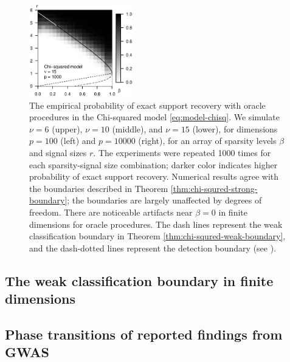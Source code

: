 \begin{figure}
      \includegraphics[width=0.4\textwidth]{./simulated_phase_diagram_chi-squared_nu15_p10000.eps}
      \caption{The empirical probability of exact support recovery with oracle procedures in the Chi-squared model \eqref{eq:model-chisq}. 
      We simulate $\nu=6$ (upper), $\nu=10$ (middle), and $\nu=15$ (lower), for dimensions $p=100$ (left) and $p=10000$ (right), for an array of sparsity levels $\beta$ and signal sizes $r$.
      The experiments were repeated 1000 times for each sparsity-signal size combination; darker color indicates higher probability of exact support recovery.  
      Numerical results agree with the boundaries described in Theorem \ref{thm:chi-squred-strong-boundary}; the boundaries are largely unaffected by degrees of freedom.
      There are noticeable artifacts near $\beta=0$ in finite dimensions for oracle procedures. 
      The dash lines represent the weak classification boundary in Theorem \ref{thm:chi-squred-weak-boundary}, and the dash-dotted lines represent the detection boundary (see \citep{donoho2004higher}).} 
      \label{fig:phase-simulated-chi-squared}
\end{figure}



\subsection{The weak classification boundary in finite dimensions}


\subsection{Phase transitions of reported findings from GWAS}